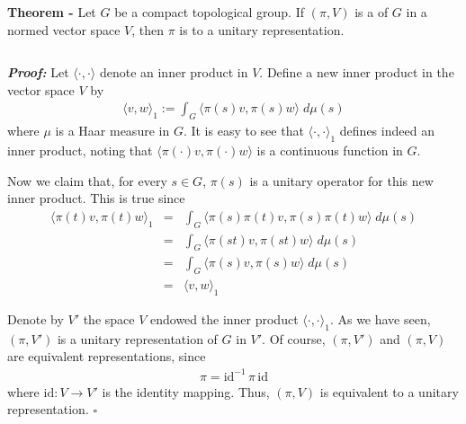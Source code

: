 \documentclass[12pt]{article}
\begin{document}

{\bf Theorem -} Let $G$ be a compact topological group. If $(\pi, V)$ is a  of $G$ in a normed vector space $V$, then $\pi$ is  to a unitary representation.

$\,$

{\bf \emph{Proof:}}  Let $\langle \cdot, \cdot \rangle$ denote an inner product in $V$. Define a new inner product in the vector space $V$ by
\begin{align*}
\langle v, w \rangle_1 := \int_G \big\langle \pi(s)v, \pi(s)w \big\rangle \;d\mu(s)
\end{align*}
where $\mu$ is a Haar measure in $G$. It is easy to see that $\langle \cdot, \cdot \rangle_1$ defines indeed an inner product, noting that $\langle \pi(\cdot)v, \pi(\cdot)w \rangle$ is a continuous function in $G$.

Now we claim that, for every $s \in G$, $\pi(s)$ is a unitary operator for this new inner product. This is true since
\begin{eqnarray*}
\big\langle \pi(t)v, \pi(t)w \big\rangle_1 & = & \int_G \big\langle \pi(s)\pi(t)v, \pi(s)\pi(t)w \big\rangle \;d\mu(s)\\
& = & \int_G \langle \pi(st)v, \pi(st)w \rangle \;d\mu(s)\\
& = & \int_G \langle \pi(s)v, \pi(s)w \rangle \;d\mu(s)\\
& = & \langle v, w \rangle_1
\end{eqnarray*}

Denote by $V'$ the space $V$ endowed the inner product $\langle \cdot, \cdot \rangle_1$. As we have seen, $(\pi, V')$ is a unitary representation of $G$ in $V'$. Of course, $(\pi, V')$ and $(\pi, V)$ are equivalent representations, since
\begin{align*}
\pi=\mathrm{id}^{-1}\,\pi\,\mathrm{id}
\end{align*}
where $\mathrm{id}:V \longrightarrow V'$ is the identity mapping. Thus, $(\pi, V)$ is equivalent to a unitary representation. $\square$
\end{document}
